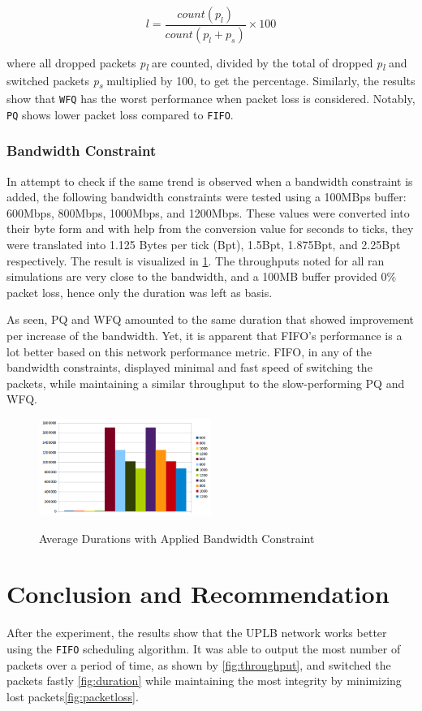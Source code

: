\documentclass[journal]{IEEE/IEEEtran}
\begin{document}
\[
	l = \frac{count(p_l)}{count(p_l + p_s)} \times 100
\]

where all dropped packets \textit{p\textsubscript{l}} are counted, divided by the total of dropped \textit{p\textsubscript{l}} and switched packets \textit{p\textsubscript{s}} multiplied by 100, to get the percentage. Similarly, the results show that \texttt{WFQ} has the worst performance when packet loss is considered. Notably, \texttt{PQ} shows lower packet loss compared to \texttt{FIFO}.

\subsubsection{Bandwidth Constraint}
In attempt to check if the same trend is observed when a bandwidth constraint is added, the following bandwidth constraints were tested using a 100MBps buffer: 600Mbps, 800Mbps, 1000Mbps, and 1200Mbps. These values were converted into their byte form and with help from the conversion value for seconds to ticks, they were translated into 1.125 Bytes per tick (Bpt), 1.5Bpt, 1.875Bpt, and 2.25Bpt respectively. The result is visualized in \ref{fig:bc}. The throughputs noted for all ran simulations are very close to the bandwidth, and a 100MB buffer provided 0\% packet loss, hence only the duration was left as  basis.

As seen, PQ and WFQ amounted to the same duration that showed improvement per increase of the bandwidth. Yet, it is apparent that FIFO's performance is a lot better based on this network performance metric. FIFO, in any of the bandwidth constraints, displayed minimal and fast speed of switching the packets, while maintaining a similar throughput to the slow-performing PQ and WFQ.

\begin{figure}
\includegraphics[width=0.5\textwidth]{duration_with_bc}
\label{fig:bc}\caption{Average Durations with Applied Bandwidth Constraint}
\end{figure}

\section{Conclusion and Recommendation}
After the experiment, the results show that the UPLB network works better using the \texttt{FIFO} scheduling algorithm. It was able to output the most number of packets over a period of time, as shown by \ref{fig:throughput}, and switched the packets fastly \ref{fig:duration} while maintaining the most integrity by minimizing lost packets\ref{fig:packetloss}.
\end{document}
